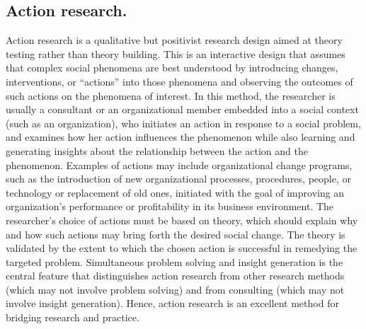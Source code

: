 \subsection{Action research.} Action research is a qualitative but positivist research design aimed at theory testing rather than theory building. This is an interactive design that assumes that complex social phenomena are best understood by introducing changes, interventions, or ``actions'' into those phenomena and observing the outcomes of such actions on the phenomena of interest. In this method, the researcher is usually a consultant or an organizational member embedded into a social context (such as an organization), who initiates an action in response to a social problem, and examines how her action influences the phenomenon while also learning and generating insights about the relationship between the action and the phenomenon. Examples of actions may include organizational change programs, such as the introduction of new organizational processes, procedures, people, or technology or replacement of old ones, initiated with the goal of improving an organization's performance or profitability in its business environment. The researcher's choice of actions must be based on theory, which should explain why and how such actions may bring forth the desired social change. The theory is validated by the extent to which the chosen action is successful in remedying the targeted problem. Simultaneous problem solving and insight generation is the central feature that distinguishes action research from other research methods (which may not involve problem solving) and from consulting (which may not involve insight generation). Hence, action research is an excellent method for bridging research and practice.

